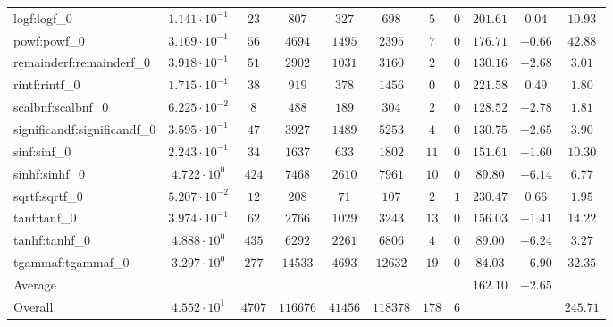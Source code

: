 \begin{tabular}{|l|c|c|c|c|c|c|c|c|c|c|}
logf:logf\_0                 & $ 1.141 \cdot 10^{-1} $ & $ 23     $ & $ 807    $ & $ 327   $ & $ 698    $ & $ 5   $ & $ 0 $ & $ 201.61      $ & $ 0.04    $ & $ 10.93   $ \\
powf:powf\_0                 & $ 3.169 \cdot 10^{-1} $ & $ 56     $ & $ 4694   $ & $ 1495  $ & $ 2395   $ & $ 7   $ & $ 0 $ & $ 176.71      $ & $ -0.66   $ & $ 42.88   $ \\
remainderf:remainderf\_0     & $ 3.918 \cdot 10^{-1} $ & $ 51     $ & $ 2902   $ & $ 1031  $ & $ 3160   $ & $ 2   $ & $ 0 $ & $ 130.16      $ & $ -2.68   $ & $ 3.01    $ \\
rintf:rintf\_0               & $ 1.715 \cdot 10^{-1} $ & $ 38     $ & $ 919    $ & $ 378   $ & $ 1456   $ & $ 0   $ & $ 0 $ & $ 221.58      $ & $ 0.49    $ & $ 1.80    $ \\
scalbnf:scalbnf\_0           & $ 6.225 \cdot 10^{-2} $ & $ 8      $ & $ 488    $ & $ 189   $ & $ 304    $ & $ 2   $ & $ 0 $ & $ 128.52      $ & $ -2.78   $ & $ 1.81    $ \\
significandf:significandf\_0 & $ 3.595 \cdot 10^{-1} $ & $ 47     $ & $ 3927   $ & $ 1489  $ & $ 5253   $ & $ 4   $ & $ 0 $ & $ 130.75      $ & $ -2.65   $ & $ 3.90    $ \\
sinf:sinf\_0                 & $ 2.243 \cdot 10^{-1} $ & $ 34     $ & $ 1637   $ & $ 633   $ & $ 1802   $ & $ 11  $ & $ 0 $ & $ 151.61      $ & $ -1.60   $ & $ 10.30   $ \\
sinhf:sinhf\_0               & $ 4.722 \cdot 10^{0}  $ & $ 424    $ & $ 7468   $ & $ 2610  $ & $ 7961   $ & $ 10  $ & $ 0 $ & $ 89.80       $ & $ -6.14   $ & $ 6.77    $ \\
sqrtf:sqrtf\_0               & $ 5.207 \cdot 10^{-2} $ & $ 12     $ & $ 208    $ & $ 71    $ & $ 107    $ & $ 2   $ & $ 1 $ & $ 230.47      $ & $ 0.66    $ & $ 1.95    $ \\
tanf:tanf\_0                 & $ 3.974 \cdot 10^{-1} $ & $ 62     $ & $ 2766   $ & $ 1029  $ & $ 3243   $ & $ 13  $ & $ 0 $ & $ 156.03      $ & $ -1.41   $ & $ 14.22   $ \\
tanhf:tanhf\_0               & $ 4.888 \cdot 10^{0}  $ & $ 435    $ & $ 6292   $ & $ 2261  $ & $ 6806   $ & $ 4   $ & $ 0 $ & $ 89.00       $ & $ -6.24   $ & $ 3.27    $ \\
tgammaf:tgammaf\_0           & $ 3.297 \cdot 10^{0}  $ & $ 277    $ & $ 14533  $ & $ 4693  $ & $ 12632  $ & $ 19  $ & $ 0 $ & $ 84.03       $ & $ -6.90   $ & $ 32.35   $ \\
\hline
Average                      & $                     $ & $        $ & $        $ & $       $ & $        $ & $     $ & $   $ & $ 162.10      $ & $ -2.65   $ & $         $ \\
\hline
Overall                      & $ 4.552 \cdot 10^{1}  $ & $ 4707   $ & $ 116676 $ & $ 41456 $ & $ 118378 $ & $ 178 $ & $ 6 $ & $             $ & $         $ & $ 245.71  $ \\
\hline
\end{tabular}
